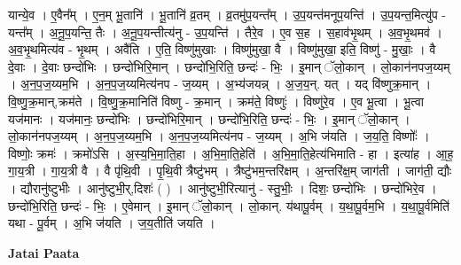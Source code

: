 \documentclass[17pt]{extarticle}
\begin{document}
यान्ये॒व । ए॒वैन᳚म् । ए॒न॒म् भू॒तानि॑ । भू॒तानि॑ व्र॒तम् । व्र॒तमु॑प॒यन्त᳚म् । उ॒प॒यन्त॑मनूप॒यन्ति॑ । उ॒प॒यन्त॒मित्यु॑प - यन्त᳚म् । अ॒नू॒प॒यन्ति॒ तैः । अ॒नू॒प॒यन्तीत्य॑नु - उ॒प॒यन्ति॑ । तैरे॒व । ए॒व स॒ह । स॒हाव॑भृ॒थम् । अ॒व॒भृ॒थमव॑ । अ॒व॒भृ॒थमित्य॑व - भृ॒थम् । अवै॑ति । ए॒ति॒ विष्णु॑मुखाः । विष्णु॑मुखा॒ वै । विष्णु॑मुखा॒ इति॒ विष्णु॑ - मु॒खाः॒ । वै दे॒वाः । दे॒वाः छन्दो॑भिः । छन्दो॑भिरि॒मान् । छन्दो॑भि॒रिति॒ छन्दः॑ - भिः॒ । इ॒मान् ॅलो॒कान् । लो॒कान॑नपज॒य्यम् । अ॒न॒प॒ज॒य्यम॒भि । अ॒न॒प॒ज॒य्यमित्य॑नप - ज॒य्यम् । अ॒भ्य॑जयन्न् । अ॒ज॒य॒न्. यत् । यद् वि॑ष्णुक्र॒मान् । वि॒ष्णु॒क्र॒मान्,क्रम॑ते । वि॒ष्णु॒क्र॒मानिति॑ विष्णु - क्र॒मान् । क्रम॑ते॒ विष्णुः॑ । विष्णु॑रे॒व । ए॒व भू॒त्वा । भू॒त्वा यज॑मानः । यज॑मानः॒ छन्दो॑भिः । छन्दो॑भिरि॒मान् । छन्दो॑भि॒रिति॒ छन्दः॑ - भिः॒ । इ॒मान् ॅलो॒कान् । लो॒कान॑नपज॒य्यम् । अ॒न॒प॒ज॒य्यम॒भि । अ॒न॒प॒ज॒य्यमित्य॑नप - ज॒य्यम् । अ॒भि ज॑यति । ज॒य॒ति॒ विष्णोः᳚ । विष्णोः॒ क्रमः॑ । क्रमो॑ऽसि । अ॒स्य॒भि॒मा॒ति॒हा । अ॒भि॒मा॒ति॒हेति॑ । अ॒भि॒मा॒ति॒हेत्य॑भिमाति - हा । इत्या॑ह । आ॒ह॒ गा॒य॒त्री । गा॒य॒त्री वै । वै पृ॑थि॒वी । पृ॒थि॒वी त्रैष्टु॑भम् । त्रैष्टु॑भम॒न्तरि॑क्षम् । अ॒न्तरि॑क्ष॒म् जाग॑ती । जाग॑ती॒ द्यौः । द्यौरानु॑ष्टुभीः । आनु॑ष्टुभी॒र्,दिशः॑ ( ) । आनु॑ष्टुभी॒रित्यानु॑ - स्तु॒भीः॒ । दिशः॒ छन्दो॑भिः । छन्दो॑भिरे॒व । छन्दो॑भि॒रिति॒ छन्दः॑ - भिः॒ । ए॒वेमान् । इ॒मान् ॅलो॒कान् । लो॒कान्. य॑थापू॒र्वम् । य॒था॒पू॒र्वम॒भि । य॒था॒पू॒र्वमिति॑ यथा - पू॒र्वम् । अ॒भि ज॑यति । ज॒य॒तीति॑ जयति । \newline

\textbf{Jatai Paata} \newline
\end{document}
